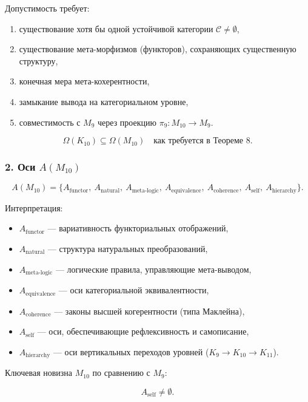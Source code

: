 Допустимость требует:

\begin{enumerate}
    \item существование хотя бы одной устойчивой категории $\mathcal{C}\neq\emptyset$,
    \item существование мета-морфизмов (функторов), сохраняющих существенную структуру,
    \item конечная мера мета-кохерентности,
    \item замыкание вывода на категориальном уровне,
    \item совместимость с $M_9$ через проекцию $\pi_{9}:M_{10}\to M_9$.
\end{enumerate}

\[
\Omega(K_{10})\subseteq\Omega(M_{10}) \quad\text{как требуется в Теореме 8}.
\]


\subsubsection*{2. Оси $A(M_{10})$}

\[
A(M_{10}) =
\{
A_{\mathrm{functor}},\
A_{\mathrm{natural}},\
A_{\mathrm{meta\mbox{-}logic}},\
A_{\mathrm{equivalence}},\
A_{\mathrm{coherence}},\
A_{\mathrm{self}},\
A_{\mathrm{hierarchy}}
\}.
\]

Интерпретация:

\begin{itemize}
    \item $A_{\mathrm{functor}}$ — вариативность функториальных отображений,
    \item $A_{\mathrm{natural}}$ — структура натуральных преобразований,
    \item $A_{\mathrm{meta\mbox{-}logic}}$ — логические правила, управляющие мета-выводом,
    \item $A_{\mathrm{equivalence}}$ — оси категориальной эквивалентности,
    \item $A_{\mathrm{coherence}}$ — законы высшей когерентности (типа Маклейна),
    \item $A_{\mathrm{self}}$ — оси, обеспечивающие рефлексивность и самописание,
    \item $A_{\mathrm{hierarchy}}$ — оси вертикальных переходов уровней ($K_9\to K_{10}\to K_{11}$).
\end{itemize}

Ключевая новизна $M_{10}$ по сравнению с $M_9$:

\[
A_{\mathrm{self}} \ne \emptyset.
\]

